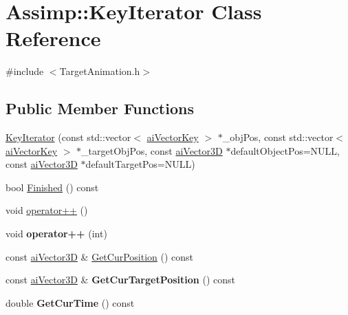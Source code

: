 \hypertarget{class_assimp_1_1_key_iterator}{\section{Assimp\+:\+:Key\+Iterator Class Reference}
\label{class_assimp_1_1_key_iterator}
}


{\ttfamily \#include $<$Target\+Animation.\+h$>$}

\subsection*{Public Member Functions}
\begin{DoxyCompactItemize}
\item 
\hyperlink{class_assimp_1_1_key_iterator_a8068f413692b67907af964fecf8e3bd7}{Key\+Iterator} (const std\+::vector$<$ \hyperlink{structai_vector_key}{ai\+Vector\+Key} $>$ $\ast$\+\_\+obj\+Pos, const std\+::vector$<$ \hyperlink{structai_vector_key}{ai\+Vector\+Key} $>$ $\ast$\+\_\+target\+Obj\+Pos, const \hyperlink{structai_vector3_d}{ai\+Vector3\+D} $\ast$default\+Object\+Pos=N\+U\+L\+L, const \hyperlink{structai_vector3_d}{ai\+Vector3\+D} $\ast$default\+Target\+Pos=N\+U\+L\+L)
\item 
bool \hyperlink{class_assimp_1_1_key_iterator_a62264e22d2be04bf86b5cd094a8b5308}{Finished} () const 
\item 
void \hyperlink{class_assimp_1_1_key_iterator_ad87c8ef75d69ef2940deec28425c66f9}{operator++} ()
\item 
\hypertarget{class_assimp_1_1_key_iterator_aeaca398ca077fd2f6164c596e4307497}{void {\bfseries operator++} (int)}\label{class_assimp_1_1_key_iterator_aeaca398ca077fd2f6164c596e4307497}

\item 
const \hyperlink{structai_vector3_d}{ai\+Vector3\+D} \& \hyperlink{class_assimp_1_1_key_iterator_aa3db40820a7eccf1ede4d1a8cb5f93e5}{Get\+Cur\+Position} () const 
\item 
\hypertarget{class_assimp_1_1_key_iterator_a76f992a8b909242172ac5bb387b7eee3}{const \hyperlink{structai_vector3_d}{ai\+Vector3\+D} \& {\bfseries Get\+Cur\+Target\+Position} () const }\label{class_assimp_1_1_key_iterator_a76f992a8b909242172ac5bb387b7eee3}

\item 
\hypertarget{class_assimp_1_1_key_iterator_a11a65fd3f18654a61e026e1fc6e1b65d}{double {\bfseries Get\+Cur\+Time} () const }\label{class_assimp_1_1_key_iterator_a11a65fd3f18654a61e026e1fc6e1b65d}

\end{DoxyCompactItemize}


